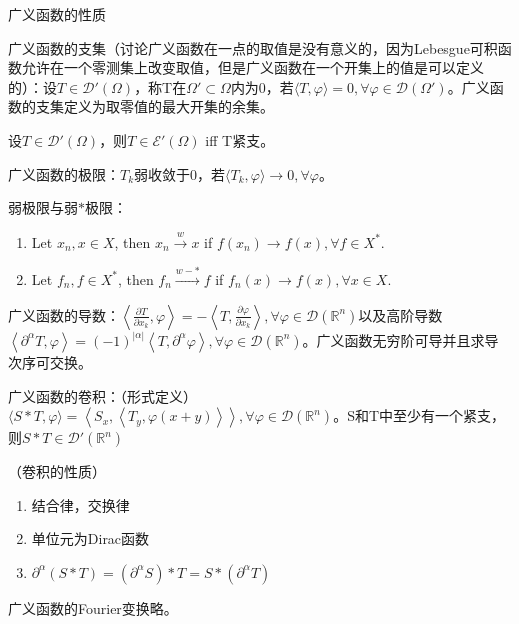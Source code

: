 广义函数的性质

\begin{df}
  广义函数的支集（讨论广义函数在一点的取值是没有意义的，因为Lebesgue可积函数允许在一个零测集上改变取值，但是广义函数在一个开集上的值是可以定义的）：设$T \in \mathscr{D}'(\Omega)$，称T在$\Omega' \subset \Omega$内为0，若$\langle T, \varphi \rangle = 0, \forall \varphi \in \mathscr{D}(\Omega')$。广义函数的支集定义为取零值的最大开集的余集。
\end{df}

\begin{thm}
  设$T \in \mathscr{D}'(\Omega)$，则$T \in \mathscr{E}'(\Omega)$ iff T紧支。
\end{thm}

\begin{df}
  广义函数的极限：$T_k$弱收敛于0，若$\langle T_k, \varphi \rangle \to 0, \forall \varphi$。

  弱极限与弱$\ast$极限：
  \begin{enumerate}
    \item Let $x_n, x \in X$, then $x_n \overset{w}{\longrightarrow} x$ if $f(x_n) \longrightarrow f(x), \forall f \in X^{\ast}$.
    \item Let $f_n, f \in X^{\ast}$, then $f_n \overset{w-\ast}{\longrightarrow} f$ if $f_n(x) \longrightarrow f(x), \forall x \in X$.
  \end{enumerate}
\end{df}

\begin{df}
  广义函数的导数：$\left\langle\frac{\partial T}{\partial x_{k}}, \varphi\right\rangle = -\left\langle T, \frac{\partial \varphi}{\partial x_{k}}\right\rangle, \forall \varphi \in \mathscr{D}\left(\mathbb{R}^{n}\right)$以及高阶导数$\left\langle\partial^{\alpha} T, \varphi\right\rangle=(-1)^{|\alpha|}\left\langle T, \partial^{\alpha} \varphi\right\rangle, \forall \varphi \in \mathscr{D}\left(\mathbb{R}^{n}\right)$。广义函数无穷阶可导并且求导次序可交换。
\end{df}

\begin{df}
  广义函数的卷积：（形式定义）$\langle S * T, \varphi\rangle=\left\langle S_{x},\left\langle T_{y}, \varphi(x+y)\right\rangle\right\rangle, \forall \varphi \in \mathscr{D}\left(\mathbb{R}^{n}\right)$。S和T中至少有一个紧支，则$S * T \in \mathscr{D}'(\mathbb{R}^{n})$
\end{df}

\begin{prop}（卷积的性质）
  \begin{enumerate}
    \item 结合律，交换律
    \item 单位元为Dirac函数
    \item $\partial^\alpha(S * T) = (\partial^\alpha S) * T = S * (\partial^\alpha T)$
  \end{enumerate}
\end{prop}

广义函数的Fourier变换略。

\vspace{60pt}





















